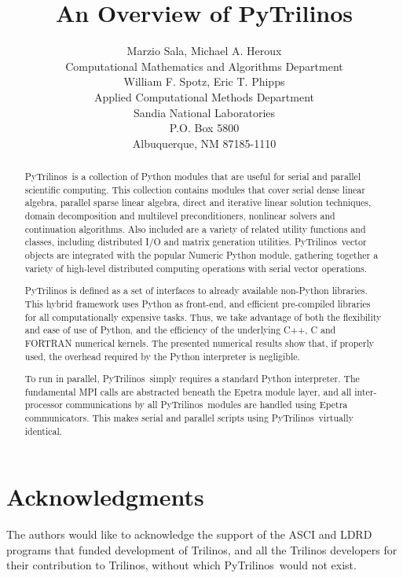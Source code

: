 \documentclass[10pt,relax]{SANDreport}
\author{Marzio Sala, Michael A. Heroux\\
Computational Mathematics and Algorithms Department \\ [10pt]
William F. Spotz, Eric T. Phipps \\
Applied Computational Methods Department \\ [10pt]
Sandia National Laboratories \\
P.O. Box 5800 \\
Albuquerque, NM 87185-1110 \\
}
\title{An Overview of PyTrilinos}
\newcommand{\PyTrilinos}{{PyTrilinos}}
\begin{document}
\maketitle

\begin{abstract}
\PyTrilinos\ is a collection of Python modules that are useful for
serial and parallel scientific computing. This collection contains
modules that cover serial dense linear algebra, parallel sparse
linear algebra, direct and iterative linear solution techniques,
domain decomposition and multilevel preconditioners, nonlinear
solvers and continuation algorithms. Also included are a variety of
related utility functions and classes, including distributed I/O and
matrix generation utilities. \PyTrilinos\ vector objects are
integrated with the popular Numeric Python module, gathering
together a variety of high-level distributed computing operations
with serial vector operations.

PyTrilinos is defined as a set of interfaces to already available
non-Python libraries. This hybrid framework uses Python as
front-end, and efficient pre-compiled libraries for all
computationally expensive tasks. Thus, we take advantage of both the
flexibility and ease of use of Python, and the efficiency of the
underlying C++, C and FORTRAN numerical kernels. The presented
numerical results show that, if properly used, the overhead required
by the Python interpreter is negligible.

To run in parallel, \PyTrilinos\ simply requires a standard Python
interpreter.  The fundamental MPI calls are abstracted beneath the
Epetra module layer, and all inter-processor communications by all
\PyTrilinos\ modules are handled using Epetra communicators. This
makes serial and parallel scripts using \PyTrilinos\ virtually
identical.
\end{abstract}

\clearpage
\section*{Acknowledgments}
The authors would like to acknowledge the support of the ASCI and LDRD
programs that funded development of Trilinos, and all the Trilinos
developers for their contribution to Trilinos, without which
\PyTrilinos\ would not exist.

\medskip

\SANDmain
\tableofcontents
\newpage

\end{document}
